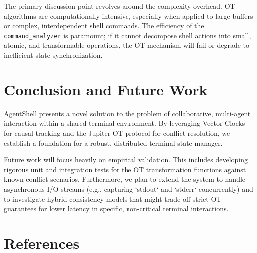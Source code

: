 \documentclass[11pt,a4paper]{article}
\begin{document}
The primary discussion point revolves around the complexity overhead. OT algorithms are computationally intensive, especially when applied to large buffers or complex, interdependent shell commands. The efficiency of the \texttt{command\_analyzer} is paramount; if it cannot decompose shell actions into small, atomic, and transformable operations, the OT mechanism will fail or degrade to inefficient state synchronization.

\section{Conclusion and Future Work}
AgentShell presents a novel solution to the problem of collaborative, multi-agent interaction within a shared terminal environment. By leveraging Vector Clocks for causal tracking and the Jupiter OT protocol for conflict resolution, we establish a foundation for a robust, distributed terminal state manager.

Future work will focus heavily on empirical validation. This includes developing rigorous unit and integration tests for the OT transformation functions against known conflict scenarios. Furthermore, we plan to extend the system to handle asynchronous I/O streams (e.g., capturing `stdout` and `stderr` concurrently) and to investigate hybrid consistency models that might trade off strict OT guarantees for lower latency in specific, non-critical terminal interactions.

\section*{References}


\end{document}

